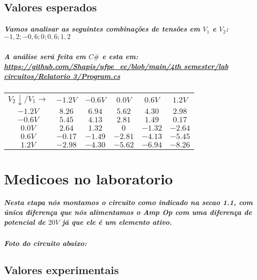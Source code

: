 \documentclass[12pt,twoside, a4paper, twocolumn]{article}
\begin{document}
\subsection{Valores esperados}

\subparagraph*{Vamos analisar as seguintes combinações de tensões em $V_1$ e $V_2$: ${-1,2 ; -0,6 ; 0 ; 0,6 ; 1,2}$}

\subparagraph*{A análise será feita em $C\#$ e esta em: \url{https://github.com/Shapis/ufpe_ee/blob/main/4th semester/lab circuitos/Relatorio 3/Program.cs}}

\begin{center}
    \begin{tabular}{ |c|ccccc| }
        \hline
        $V_2 \downarrow / V_1 \rightarrow $ & $-1.2V$ & $-0.6V$ & $0.0V$  & $0.6V$  & $1.2V$  \\
        $-1.2V$                             & $8.26$  & $6.94$  & $5.62$  & $4.30$  & $2.98$  \\
        $ -0.6V$                            & $5.45$  & $4.13$  & $2.81$  & $1.49$  & $0.17$  \\
        $0.0V$                              & $2.64$  & $1.32$  & $0$     & $-1.32$ & $-2.64$ \\
        $ 0.6V$                             & $-0.17$ & $-1.49$ & $-2.81$ & $-4.13$ & $-5.45$ \\
        $ 1.2V$                             & $-2.98$ & $-4.30$ & $-5.62$ & $-6.94$ & $-8.26$ \\
        \hline
    \end{tabular}
\end{center}

\section{Medicoes no laboratorio}

\subparagraph*{Nesta etapa nós montamos o circuito como indicado na secao 1.1, com única diferença que nós alimentamos o Amp Op com uma diferença de potencial de $20V$ já que ele é um elemento ativo.}

\subparagraph*{Foto do circuito abaixo:}
\subparagraph*{}



\subsection{Valores experimentais}
\end{document}
